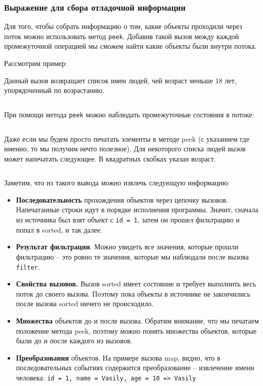 \subsubsection{Выражение для сбора отладочной информации}\label{build-expression}
Для того, чтобы собрать информацию о том, какие объекты проходили через поток можно использовать метод \texttt{peek}. Добавив такой вызов между каждой промежуточной операцией мы сможем найти какие объекты были внутри потока.

Рассмотрим пример:

Данный вызов возвращает список имен людей, чей возраст меньше 18 лет, упорядоченный по возрастанию.
\inputminted{java}{chapter2/code/StreaMWithoutPeeks.java}
При помощи метода \texttt{peek} можно наблюдать промежуточные состояния в потоке:
\inputminted{java}{chapter2/code/StreamWithPeeks.java}

Даже если мы будем просто печатать элементы в методе peek (с указанием где именно, то мы получим нечто полезное). Для некоторого списка людей вызов может напечатать следующее. В квадратных скобках указан возраст. 
\inputminted{java}{chapter2/code/peekResults.txt}

Заметим, что из такого вывода можно извлечь следующую информацию:
\begin{itemize}
	\item \textbf{Последовательность} прохождения объектов через цепочку вызовов. Напечатанные строки идут в порядке исполнения программы. Значит, сначала из источника был взят объект с \texttt{id = 1}, затем он прошел фильтрацию и попал в sorted, и так далее.
	\item \textbf{Результат фильтрации}. Можно увидеть все значения, которые прошли фильтрацию -- это ровно те значения, которые мы наблюдали после вызова \texttt{filter}.
	\item \textbf{Свойства вызовов.} Вызов sorted имеет состояние и требует выполнить весь поток до своего вызова. Поэтому пока объекты в источнике не закончились после вызова sorted ничего не происходило.
	\item \textbf{Множества } объектов до и после вызова. Обратим внимание, что мы печатаем положение метода peek, поэтому можно понять множества объектов, которые были до и после каждого из вызовов.
	\item \textbf{Преобразования} объектов. На примере вызова map, видно, что в последовательных событиях содержится преобразование -- извлечение имени человека: \texttt{{id = 1, name = Vasily, age = 10} => Vasily}
\end{itemize}

